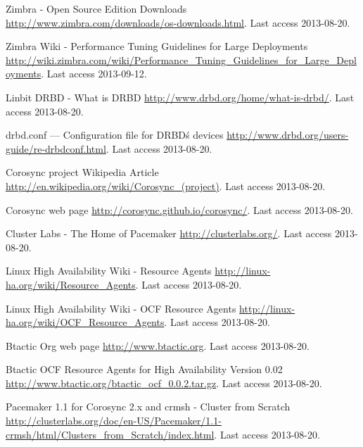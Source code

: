 \begin{thebibliography}{1}
 Zimbra - Open Source Edition Downloads
\url{http://www.zimbra.com/downloads/os-downloads.html}. Last access 2013-08-20.

 Zimbra Wiki - Performance Tuning Guidelines for Large Deployments
\url{http://wiki.zimbra.com/wiki/Performance_Tuning_Guidelines_for_Large_Deployments}. Last access 2013-09-12.


 Linbit DRBD - What is DRBD
\url{http://www.drbd.org/home/what-is-drbd/}. Last access 2013-08-20.

 drbd.conf — Configuration file for DRBD\'s devices
\url{http://www.drbd.org/users-guide/re-drbdconf.html}. Last access 2013-08-20.


 Corosync project Wikipedia Article
\url{http://en.wikipedia.org/wiki/Corosync_(project)}. Last access 2013-08-20.

 Corosync web page
\url{http://corosync.github.io/corosync/}. Last access 2013-08-20.

 Cluster Labs - The Home of Pacemaker
\url{http://clusterlabs.org/}. Last access 2013-08-20.


 Linux High Availability Wiki - Resource Agents
\url{http://linux-ha.org/wiki/Resource_Agents}. Last access 2013-08-20.

 Linux High Availability Wiki - OCF Resource Agents
\url{http://linux-ha.org/wiki/OCF_Resource_Agents}. Last access 2013-08-20.

 Btactic Org web page
\url{http://www.btactic.org}. Last access 2013-08-20.

 Btactic OCF Resource Agents for High Availability Version 0.02
\url{http://www.btactic.org/btactic_ocf_0.0.2.tar.gz}. Last access 2013-08-20.


 Pacemaker 1.1 for Corosync 2.x and crmsh - Cluster from Scratch
\url{http://clusterlabs.org/doc/en-US/Pacemaker/1.1-crmsh/html/Clusters_from_Scratch/index.html}. Last access 2013-08-20.


\end{thebibliography}
